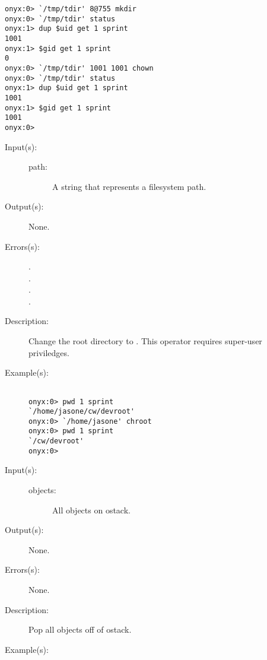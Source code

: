 \begin{description}
\begin{description}
\begin{verbatim}
onyx:0> `/tmp/tdir' 8@755 mkdir
onyx:0> `/tmp/tdir' status 
onyx:1> dup $uid get 1 sprint
1001
onyx:1> $gid get 1 sprint
0
onyx:0> `/tmp/tdir' 1001 1001 chown
onyx:0> `/tmp/tdir' status
onyx:1> dup $uid get 1 sprint
1001
onyx:1> $gid get 1 sprint
1001
onyx:0>
		\end{verbatim}
	\end{description}
\label{systemdict:chroot}
\item[{\onyxop{path}{chroot}{--}}: ]
	\begin{description}\item[]
	\item[Input(s): ]
		\begin{description}\item[]
		\item[path: ]
			A string that represents a filesystem path.
		\end{description}
	\item[Output(s): ] None.
	\item[Errors(s): ]
		\begin{description}\item[]
		\item[.]
		\item[.]
		\item[.]
		\item[.]
		\end{description}
	\item[Description: ]
		Change the root directory to .  This operator
		requires super-user priviledges.
	\item[Example(s): ]\begin{verbatim}

onyx:0> pwd 1 sprint
`/home/jasone/cw/devroot'
onyx:0> `/home/jasone' chroot
onyx:0> pwd 1 sprint
`/cw/devroot'
onyx:0>
		\end{verbatim}
	\end{description}
\label{systemdict:clear}
\item[{\onyxop{objects}{clear}{--}}: ]
	\begin{description}\item[]
	\item[Input(s): ]
		\begin{description}\item[]
		\item[objects: ]
			All objects on ostack.
		\end{description}
	\item[Output(s): ] None.
	\item[Errors(s): ] None.
	\item[Description: ]
		Pop all objects off of ostack.
	\item[Example(s): ]\begin{verbatim}


\end{verbatim}
\end{description}
\end{description}
